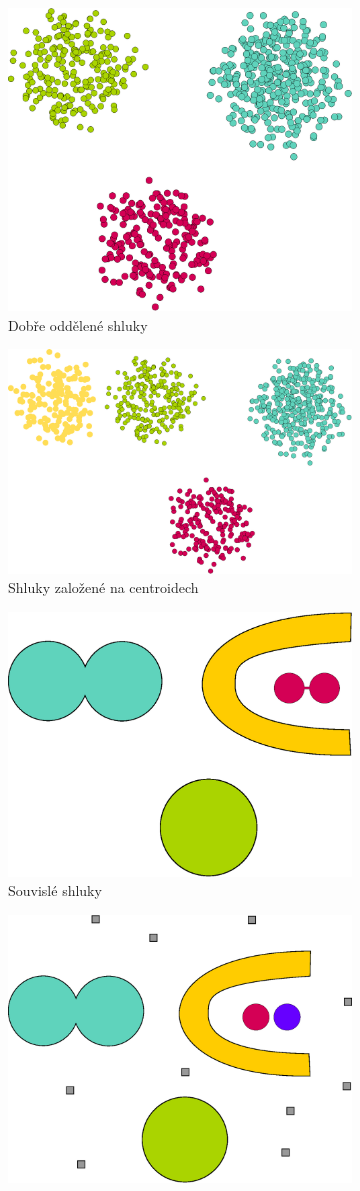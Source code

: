 \begin{figure}[h]
\centering
\begin{subfigure}{.49\textwidth}
  \centering
  \includegraphics[width=.5\linewidth]{img/wellSeparatedObjects.eps}
  \caption{Dobře oddělené shluky}
  \label{fig:wellSeparatedObjects}
\end{subfigure}
\begin{subfigure}{.49\textwidth}
  \centering
  \includegraphics[width=.5\linewidth]{img/centerBasedClusters.eps}
  \caption{Shluky založené na centroidech}
  \label{fig:centerBasedClusters}
\end{subfigure}
\vspace*{0.5cm} 
\begin{subfigure}{.49\textwidth}
  \centering
  \includegraphics[width=.5\linewidth]{img/contiguousClusters.eps}
  \caption{Souvislé shluky}
  \label{fig:contiguousClusters}
\end{subfigure}
\begin{subfigure}{.49\textwidth}
  \centering
  \includegraphics[width=.5\linewidth]{img/densityClusters.eps}

\end{subfigure}
\end{figure}
